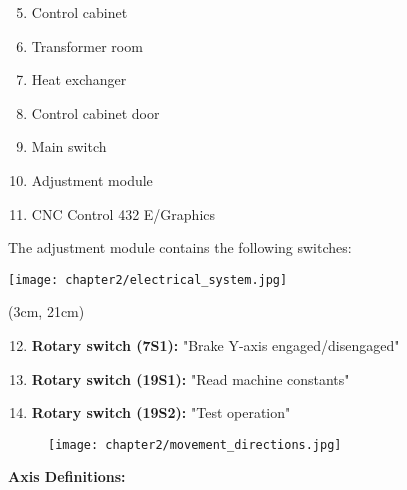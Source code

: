 \begin{minipage}[c]{0.45\textwidth}
    \begin{enumerate}[itemsep=1pt,parsep=0pt]
        \setcounter{enumi}{4}
        \item Control cabinet
        \item Transformer room
        \item Heat exchanger
        \item Control cabinet door
        \item Main switch
        \item Adjustment module
        \item CNC Control 432 E/Graphics
    \end{enumerate}

    The adjustment module contains the following switches:
\end{minipage}%
\begin{minipage}{0.6\textwidth}
    \centering
    \texttt{[image: chapter2/electrical\_system.jpg]}
    \label{fig:electrical_system}
\end{minipage}

\begin{textblock*}{\textwidth}(3cm, 21cm)  %
    \begin{enumerate}[itemsep=1pt,parsep=0pt]
        \setcounter{enumi}{11}
        \item \textbf{Rotary switch (7S1):} "Brake Y-axis engaged/disengaged"
        \item \textbf{Rotary switch (19S1):} "Read machine constants"
        \item \textbf{Rotary switch (19S2):} "Test operation"
    \end{enumerate}
\end{textblock*}

\vspace{2cm}



\begin{figure}[h]
    \centering
    \texttt{[image: chapter2/movement\_directions.jpg]}
\end{figure}

\vspace{0.5cm}

\textbf{Axis Definitions:}

